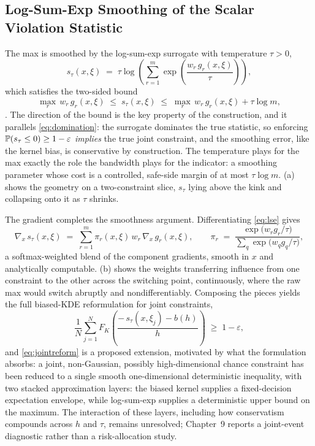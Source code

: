 \subsection{Log-Sum-Exp Smoothing of the Scalar Violation Statistic}
\label{sec:lse}

The max is smoothed by the log-sum-exp surrogate with temperature
$\tau > 0$,
\begin{equation}
  s_\tau(x,\xi)
  \;=\; \tau \log\!\left(\sum_{r=1}^{m}
  \exp\!\left(\frac{w_r\, g_r(x,\xi)}{\tau}\right)\right),
  \label{eq:lse}
\end{equation}
which satisfies the two-sided bound
\begin{equation}
  \max_r\, w_r\, g_r(x,\xi)
  \;\leq\; s_\tau(x,\xi)
  \;\leq\; \max_r\, w_r\, g_r(x,\xi) + \tau \log m ,
  \label{eq:lsebounds}
\end{equation}
\citep{boyd2004}. The direction of the bound is the key property of the construction,
and it parallels
\cref{eq:domination}: the surrogate dominates the true statistic, so
enforcing $\mathbb{P}(s_\tau \leq 0) \geq 1-\varepsilon$ \emph{implies} the
true joint constraint, and the smoothing error, like the kernel bias, is
conservative by construction. The temperature plays for the max exactly
the role the bandwidth plays for the indicator: a smoothing parameter
whose cost is a controlled, safe-side margin of at most
$\tau \log m$. (a) shows the geometry on a two-constraint
slice, $s_\tau$ lying above the kink and collapsing onto it as $\tau$
shrinks.

The gradient completes the smoothness argument. Differentiating
\cref{eq:lse} gives
\begin{equation}
  \nabla_x\, s_\tau(x,\xi)
  \;=\; \sum_{r=1}^{m} \pi_r(x,\xi)\, w_r\, \nabla_x\, g_r(x,\xi),
  \qquad
  \pi_r \;=\;
  \frac{\exp\bigl(w_r g_r / \tau\bigr)}
       {\sum_{q} \exp\bigl(w_q g_q / \tau\bigr)} ,
  \label{eq:lsegrad}
\end{equation}
a softmax-weighted blend of the component gradients, smooth in $x$ and
analytically computable. (b) shows the weights transferring
influence from one constraint to the other across the switching point,
continuously, where the raw max would switch abruptly and
nondifferentiably. Composing the pieces yields the full biased-KDE
reformulation for joint constraints,
\begin{equation}
  \frac{1}{N}\sum_{j=1}^{N}
  F_K\!\left(\frac{-\,s_\tau(x,\xi_j) - b(h)}{h}\right)
  \;\geq\; 1-\varepsilon ,
  \label{eq:jointreform}
\end{equation}
and \cref{eq:jointreform} is a proposed extension, motivated by what the formulation absorbs: a
joint,
non-Gaussian, possibly high-dimensional chance constraint has been
reduced to a single smooth one-dimensional deterministic inequality,
with two stacked approximation layers: the biased kernel supplies a fixed-decision expectation envelope, while log-sum-exp supplies a deterministic upper bound on the maximum. The
interaction of these layers, including how conservatism compounds across $h$ and $\tau$, remains unresolved; Chapter~9 reports a joint-event diagnostic rather than a risk-allocation study.


